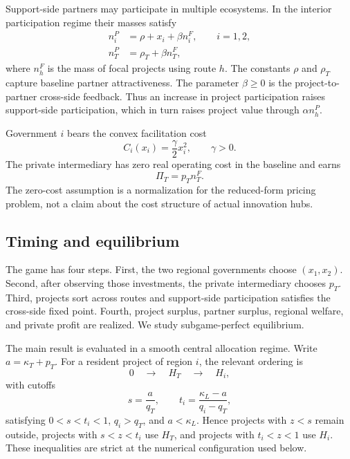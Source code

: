 Support-side partners may participate in multiple ecosystems. In the interior participation regime their masses satisfy
\begin{align}
n_i^P &= \rho+x_i+\beta n_i^F,\qquad i=1,2, \label{eq:partnerlocal}\\
n_T^P &= \rho_T+\beta n_T^F, \label{eq:partnerprivate}
\end{align}
where $n_h^F$ is the mass of focal projects using route $h$. The constants $\rho$ and $\rho_T$ capture baseline partner attractiveness. The parameter $\beta\geq0$ is the project-to-partner cross-side feedback. Thus an increase in project participation raises support-side participation, which in turn raises project value through $\alpha n_h^P$.

Government $i$ bears the convex facilitation cost
\begin{equation}
C_i(x_i)=\frac{\gamma}{2}x_i^2,\qquad \gamma>0.
\label{eq:publiccost}
\end{equation}
The private intermediary has zero real operating cost in the baseline and earns
\begin{equation}
\Pi_T=p_T n_T^F.
\label{eq:privateprofit}
\end{equation}
The zero-cost assumption is a normalization for the reduced-form pricing problem, not a claim about the cost structure of actual innovation hubs.

\subsection{Timing and equilibrium}

The game has four steps. First, the two regional governments choose $(x_1,x_2)$. Second, after observing those investments, the private intermediary chooses $p_T$. Third, projects sort across routes and support-side participation satisfies the cross-side fixed point. Fourth, project surplus, partner surplus, regional welfare, and private profit are realized. We study subgame-perfect equilibrium.

The main result is evaluated in a smooth central allocation regime. Write $a=\kappa_T+p_T$. For a resident project of region $i$, the relevant ordering is
\[
0\quad\longrightarrow\quad H_T\quad\longrightarrow\quad H_i,
\]
with cutoffs
\begin{equation}
s=\frac{a}{q_T},\qquad
t_i=\frac{\kappa_L-a}{q_i-q_T},
\label{eq:cutoffs}
\end{equation}
satisfying $0<s<t_i<1$, $q_i>q_T$, and $a<\kappa_L$. Hence projects with $z<s$ remain outside, projects with $s<z<t_i$ use $H_T$, and projects with $t_i<z<1$ use $H_i$. These inequalities are strict at the numerical configuration used below.

